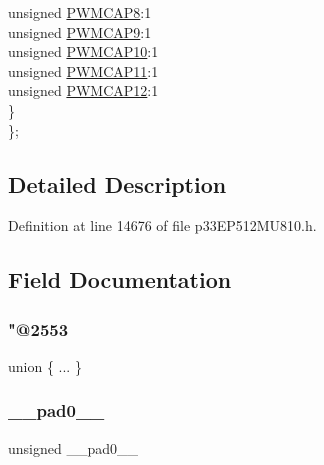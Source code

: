 \begin{DoxyCompactItemize}
\begin{tabbing}
\>\>unsigned \hyperlink{structtag_p_w_m_c_a_p3_b_i_t_s_a01b802d233dbea59cd23996d219e39c9}{PWMCAP8}:1\\
\>\>unsigned \hyperlink{structtag_p_w_m_c_a_p3_b_i_t_s_a9a0cd5d7a58681927adecfd9946b75fb}{PWMCAP9}:1\\
\>\>unsigned \hyperlink{structtag_p_w_m_c_a_p3_b_i_t_s_a765ff5b5b1008d8aeb0359590759bd42}{PWMCAP10}:1\\
\>\>unsigned \hyperlink{structtag_p_w_m_c_a_p3_b_i_t_s_a50c60306a98023b9bb8fac50c8d5e965}{PWMCAP11}:1\\
\>\>unsigned \hyperlink{structtag_p_w_m_c_a_p3_b_i_t_s_a8fec92523cf22c89f156a97aca44dcff}{PWMCAP12}:1\\
\>\} \\
\}; \\

\end{tabbing}\end{DoxyCompactItemize}


\subsection{Detailed Description}


Definition at line 14676 of file p33\+E\+P512\+M\+U810.\+h.



\subsection{Field Documentation}
\mbox{\label{structtag_p_w_m_c_a_p3_b_i_t_s_a4366d711ff289271364f7df7cede0f31}} 
\subsubsection{\texorpdfstring{"@2553}{@2553}}
{\footnotesize\ttfamily union \{ ... \} }

\mbox{\label{structtag_p_w_m_c_a_p3_b_i_t_s_adf71f3d8410c1f1dbbc96680a92c49af}} 
\subsubsection{\texorpdfstring{\+\_\+\+\_\+pad0\+\_\+\+\_\+}{\_\_pad0\_\_}}
{\footnotesize\ttfamily unsigned \+\_\+\+\_\+pad0\+\_\+\+\_\+}



